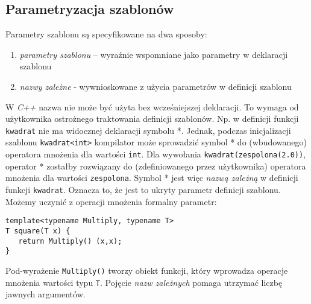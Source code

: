 \documentclass[11pt, a4paper]{article}
\begin{document}
\lstset{language=C++}

\subsection{Parametryzacja szablonów}

Parametry szablonu są specyfikowane na dwa sposoby:

\begin{enumerate}

\item \emph{parametry szablonu} – wyraźnie wspomniane jako parametry w deklaracji szablonu

\item \emph{nazwy zależne} - wywnioskowane z użycia parametrów w definicji szablonu

\end{enumerate}

W \emph{C++} nazwa nie może być użyta bez wcześniejszej deklaracji. To wymaga od użytkownika ostrożnego traktowania definicji szablonów. Np. w definicji funkcji \verb#kwadrat# nie ma widocznej deklaracji symbolu *. Jednak, podczas inicjalizacji szablonu \verb#kwadrat<int># kompilator może sprowadzić symbol * do (wbudowanego) operatora mnożenia dla wartości \verb#int#. Dla wywołania \verb#kwadrat(zespolona(2.0))#, operator * zostałby rozwiązany do (zdefiniowanego przez użytkownika) operatora mnożenia dla wartości \verb#zespolona#. Symbol * jest więc \emph{nazwą zależną} w definicji funkcji \verb#kwadrat#. Oznacza to, że jest to ukryty parametr definicji szablonu. Możemy uczynić z operacji mnożenia formalny parametr:

\begin{lstlisting}[frame=single]
template<typename Multiply, typename T>
T square(T x) {
   return Multiply() (x,x);
}
\end{lstlisting}

Pod-wyrażenie \verb#Multiply()# tworzy obiekt funkcji, który wprowadza operacje mnożenia wartości typu \verb#T#. Pojęcie \emph{nazw zależnych} pomaga utrzymać liczbę jawnych argumentów.
\end{document}
